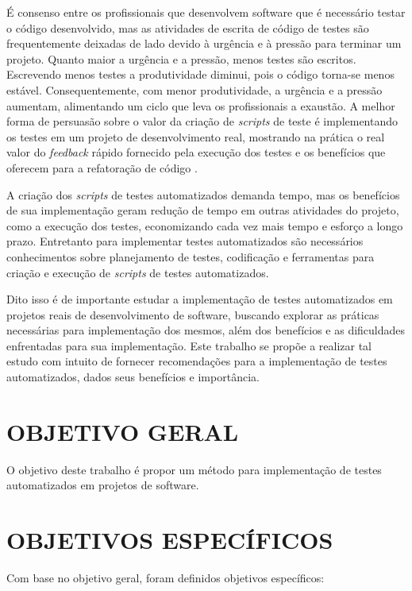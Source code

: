 É consenso entre os profissionais que desenvolvem software que é necessário testar o código desenvolvido, mas  as atividades de escrita de código de testes são frequentemente deixadas de lado devido à urgência e à pressão para terminar um projeto. Quanto maior a urgência e a pressão, menos testes são escritos. Escrevendo menos testes a produtividade diminui, pois o código torna-se menos estável. Consequentemente, com menor produtividade, a urgência e a pressão aumentam, alimentando um ciclo que leva os profissionais a exaustão. A melhor forma de persuasão sobre o valor da criação de \emph{scripts} de teste é implementando os testes em um projeto de desenvolvimento real, mostrando na prática o real valor do \emph{feedback} rápido fornecido pela execução dos testes e os benefícios que oferecem para a refatoração de código \cite{beck1998test}.

A criação dos \emph{scripts} de testes automatizados demanda tempo, mas os benefícios de sua implementação geram redução de tempo em outras atividades do projeto, como a execução dos testes, economizando cada vez mais tempo e esforço a longo prazo. Entretanto para implementar testes automatizados são necessários conhecimentos sobre planejamento de testes, codificação e ferramentas para criação e execução de \emph{scripts} de testes automatizados.

Dito isso é de importante estudar a implementação de testes automatizados em projetos reais de desenvolvimento de software, buscando explorar as práticas necessárias para implementação dos mesmos, além dos benefícios e as dificuldades enfrentadas para sua implementação. Este trabalho se propõe a realizar tal estudo com intuito de fornecer recomendações para a implementação de testes automatizados, dados seus benefícios e importância.

\section{OBJETIVO GERAL}

O objetivo deste trabalho é propor um método para implementação de testes automatizados em projetos de software.

\section{OBJETIVOS ESPECÍFICOS}
Com base no objetivo geral, foram definidos objetivos específicos:


